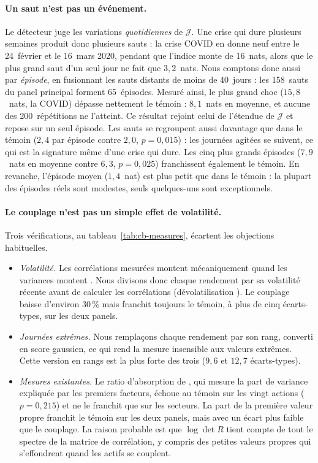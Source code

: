 \documentclass[11pt]{article}
\theoremstyle{definition}
\newcommand{\JJ}{\mathcal{J}}
\begin{document}
\paragraph{Un saut n'est pas un événement.} Le détecteur juge les
variations \emph{quotidiennes} de $\JJ$. Une crise qui dure plusieurs semaines
produit donc plusieurs sauts : la crise COVID en donne neuf entre le
24~février et le 16~mars 2020, pendant que l'indice monte de 16~nats, alors
que le plus grand saut d'un seul jour ne fait que $3{,}2$~nats. Nous comptons
donc aussi par \emph{épisode}, en fusionnant les sauts distants de moins de
40~jours : les 158~sauts du panel principal forment 65~épisodes. Mesuré ainsi,
le plus grand choc ($15{,}8$~nats, la COVID) dépasse nettement le témoin :
$8{,}1$~nats en moyenne, et aucune des 200~répétitions ne l'atteint. Ce
résultat rejoint celui de l'étendue de $\JJ$ et repose sur un seul épisode.
Les sauts se regroupent aussi davantage que dans le témoin ($2{,}4$ par
épisode contre $2{,}0$, $p=0{,}015$) : les journées agitées se suivent, ce qui
est la signature même d'une crise qui dure. Les cinq plus grands épisodes
($7{,}9$~nats en moyenne contre $6{,}3$, $p=0{,}025$) franchissent également le
témoin. En revanche, l'épisode moyen ($1{,}4$~nat) est plus petit que dans le
témoin : la plupart des épisodes réels sont modestes, seuls quelques-uns sont
exceptionnels.

\paragraph{Le couplage n'est pas un simple effet de volatilité.} Trois
vérifications, au tableau~\ref{tab:cb-measures}, écartent les objections
habituelles.
\begin{itemize}
\item \emph{Volatilité.} Les corrélations mesurées montent mécaniquement quand
les variances montent \citep{forbes2002}. Nous divisons donc chaque rendement
par sa volatilité récente avant de calculer les corrélations
(\og dévolatilisation \fg). Le couplage baisse d'environ $30\,\%$ mais franchit
toujours le témoin, à plus de cinq écarts-types, sur les deux panels.
\item \emph{Journées extrêmes.} Nous remplaçons chaque rendement par son rang,
converti en score gaussien, ce qui rend la mesure insensible aux valeurs
extrêmes. Cette version \og en rangs \fg{} est la plus forte des trois
($9{,}6$ et $12{,}7$ écarts-types).
\item \emph{Mesures existantes.} Le ratio d'absorption de \citet{kritzman2011},
qui mesure la part de variance expliquée par les premiers facteurs, échoue au
témoin sur les vingt actions ($p=0{,}215$) et ne le franchit que sur les
secteurs. La part de la première valeur propre franchit le témoin sur les
deux panels, mais avec un écart plus faible que le couplage. La raison
probable est que $\log\det R$ tient compte de tout le spectre de la matrice
de corrélation, y compris des petites valeurs propres qui s'effondrent quand
les actifs se couplent.
\end{itemize}
\end{document}

